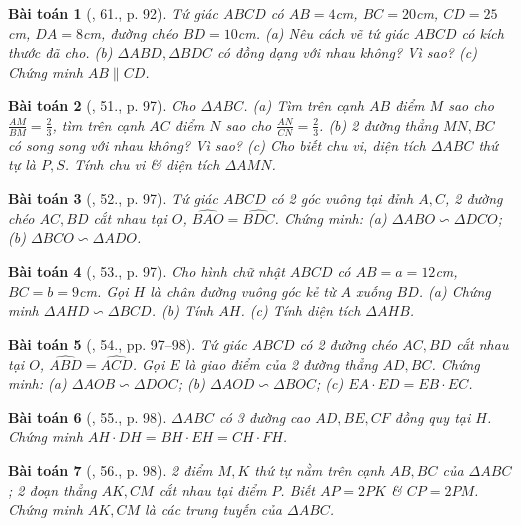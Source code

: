 \documentclass{article}
\newtheorem{baitoan}{Bài toán}
\begin{document}
\begin{baitoan}[\cite{SGK_Toan_8_tap_2}, 61., p. 92]
	Tứ giác $ABCD$ có $AB = 4$\emph{cm}, $BC = 20$\emph{cm}, $CD = 25$\emph{cm}, $DA = 8$\emph{cm}, đường chéo $BD = 10$\emph{cm}. (a) Nêu cách vẽ tứ giác $ABCD$ có kích thước đã cho. (b) $\Delta ABD,\Delta BDC$ có đồng dạng với nhau không? Vì sao? (c) Chứng minh $AB\parallel CD$.	
\end{baitoan}

\begin{baitoan}[\cite{SBT_Toan_8_tap_2}, 51., p. 97]
	Cho $\Delta ABC$. (a) Tìm trên cạnh $AB$ điểm $M$ sao cho $\frac{AM}{BM} = \frac{2}{3}$, tìm trên cạnh $AC$ điểm $N$ sao cho $\frac{AN}{CN} = \frac{2}{3}$. (b) 2 đường thẳng $MN,BC$ có song song với nhau không? Vì sao? (c) Cho biết chu vi, diện tích $\Delta ABC$ thứ tự là $P,S$. Tính chu vi \& diện tích $\Delta AMN$.
\end{baitoan}

\begin{baitoan}[\cite{SBT_Toan_8_tap_2}, 52., p. 97]
	Tứ giác $ABCD$ có 2 góc vuông tại đỉnh $A,C$, 2 đường chéo $AC,BD$ cắt nhau tại $O$, $\widehat{BAO} = \widehat{BDC}$. Chứng minh: (a) $\Delta ABO\backsim\Delta DCO$; (b) $\Delta BCO\backsim\Delta ADO$.
\end{baitoan}

\begin{baitoan}[\cite{SBT_Toan_8_tap_2}, 53., p. 97]
	Cho hình chữ nhật $ABCD$ có $AB = a = 12$\emph{cm}, $BC = b = 9$\emph{cm}. Gọi $H$ là chân đường vuông góc kẻ từ $A$ xuống $BD$. (a) Chứng minh $\Delta AHD\backsim\Delta BCD$. (b) Tính $AH$. (c) Tính diện tích $\Delta AHB$.
\end{baitoan}

\begin{baitoan}[\cite{SBT_Toan_8_tap_2}, 54., pp. 97--98]
	Tứ giác $ABCD$ có 2 đường chéo $AC,BD$ cắt nhau tại $O$, $\widehat{ABD} = \widehat{ACD}$. Gọi $E$ là giao điểm của 2 đường thẳng $AD,BC$. Chứng minh: (a) $\Delta AOB\backsim\Delta DOC$; (b) $\Delta AOD\backsim\Delta BOC$; (c) $EA\cdot ED = EB\cdot EC$.
\end{baitoan}

\begin{baitoan}[\cite{SBT_Toan_8_tap_2}, 55., p. 98]
	$\Delta ABC$ có 3 đường cao $AD,BE,CF$ đồng quy tại $H$. Chứng minh $AH\cdot DH = BH\cdot EH = CH\cdot FH$.
\end{baitoan}

\begin{baitoan}[\cite{SBT_Toan_8_tap_2}, 56., p. 98]
	2 điểm $M,K$ thứ tự nằm trên cạnh $AB,BC$ của $\Delta ABC$; 2 đoạn thẳng $AK,CM$ cắt nhau tại điểm $P$. Biết $AP = 2PK$ \& $CP = 2PM$. Chứng minh $AK,CM$ là các trung tuyến của $\Delta ABC$.
\end{baitoan}
\end{document}
